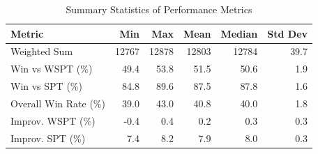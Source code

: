 \begin{table}[htbp]%
\centering%
\begin{tabular}{lrrrrr}%
\toprule%
\textbf{Metric}&\textbf{Min}&\textbf{Max}&\textbf{Mean}&\textbf{Median}&\textbf{Std Dev}\\%
\midrule%
Weighted Sum&12767&12878&12803&12784&39.7\\%
Win vs WSPT (\%)&49.4&53.8&51.5&50.6&1.9\\%
Win vs SPT (\%)&84.8&89.6&87.5&87.8&1.6\\%
Overall Win Rate (\%)&39.0&43.0&40.8&40.0&1.8\\%
Improv. WSPT (\%)&-0.4&0.4&0.2&0.3&0.3\\%
Improv. SPT (\%)&7.4&8.2&7.9&8.0&0.3\\%
\bottomrule%
\end{tabular}%
\caption{Summary Statistics of Performance Metrics}%
\label{tab:metrics}%
\end{table}